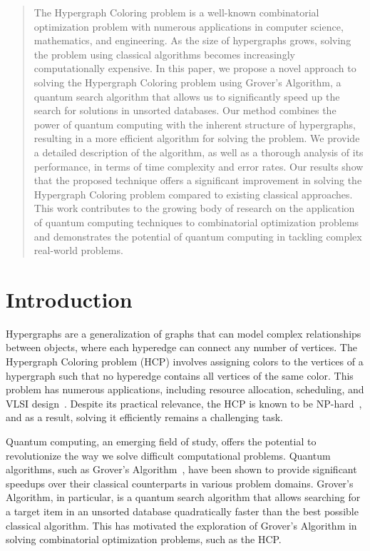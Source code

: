 \begin{abstract}
The Hypergraph Coloring problem is a well-known combinatorial optimization problem with numerous applications in computer science, mathematics, and engineering. As the size of hypergraphs grows, solving the problem using classical algorithms becomes increasingly computationally expensive. In this paper, we propose a novel approach to solving the Hypergraph Coloring problem using Grover's Algorithm, a quantum search algorithm that allows us to significantly speed up the search for solutions in unsorted databases. Our method combines the power of quantum computing with the inherent structure of hypergraphs, resulting in a more efficient algorithm for solving the problem. We provide a detailed description of the algorithm, as well as a thorough analysis of its performance, in terms of time complexity and error rates. Our results show that the proposed technique offers a significant improvement in solving the Hypergraph Coloring problem compared to existing classical approaches. This work contributes to the growing body of research on the application of quantum computing techniques to combinatorial optimization problems and demonstrates the potential of quantum computing in tackling complex real-world problems.
\end{abstract}

\section{Introduction}\label{sec:introduction}
Hypergraphs are a generalization of graphs that can model complex relationships between objects, where each hyperedge can connect any number of vertices. The Hypergraph Coloring problem (HCP) involves assigning colors to the vertices of a hypergraph such that no hyperedge contains all vertices of the same color. This problem has numerous applications, including resource allocation, scheduling, and VLSI design~\cite{berge1989hypergraphs, cukierman1998applications}. Despite its practical relevance, the HCP is known to be NP-hard~\cite{garey1979computers}, and as a result, solving it efficiently remains a challenging task.

Quantum computing, an emerging field of study, offers the potential to revolutionize the way we solve difficult computational problems. Quantum algorithms, such as Grover's Algorithm~\cite{grover1996fast}, have been shown to provide significant speedups over their classical counterparts in various problem domains. Grover's Algorithm, in particular, is a quantum search algorithm that allows searching for a target item in an unsorted database quadratically faster than the best possible classical algorithm. This has motivated the exploration of Grover's Algorithm in solving combinatorial optimization problems, such as the HCP.


